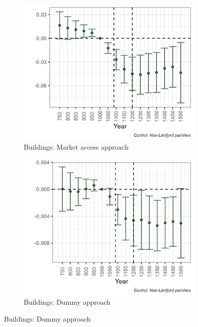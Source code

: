 \begin{figure}
\begin{subfigure}[b]{0.45\textwidth}
    \end{subfigure}
    \vspace{0.45cm}
    \begin{subfigure}[b]{0.45\textwidth}
        \centering
        \caption{Buildings: Market access approach} \label{fig:arch1c_norm}
        \includegraphics[width=\textwidth]{Plots/Regression_plots/arch_MA_buildings_norm.png}
    \end{subfigure}
    \hfill
    \begin{subfigure}[b]{0.45\textwidth}
        \centering
        \caption{Buildings: Dummy approach} \label{fig:arch1d_norm}
        \includegraphics[width=\textwidth]{Plots/Regression_plots/arch_dummy_buildings_norm.png}
    \end{subfigure}
    \label{fig:arch_reg1}
\end{figure}


